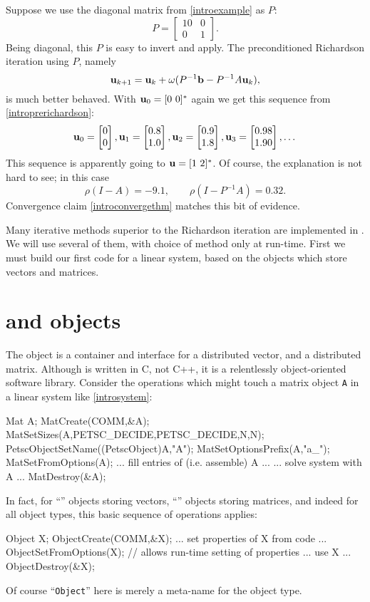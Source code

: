 \medskip\noindent\hrulefill
\begin{examplecont}  Suppose we use the diagonal matrix from  \eqref{introexample} as $P$:
\begin{equation}
P = \begin{bmatrix}
10 & 0 \\ 0 & 1
\end{bmatrix}.  \label{introP}
\end{equation}
Being diagonal, this $P$ is easy to invert and apply.  The preconditioned Richardson iteration using $P$, namely
\begin{equation}
\mathbf{u}_{k+1} = \mathbf{u}_k + \omega (P^{-1} \mathbf{b} - P^{-1} A \mathbf{u}_k),  \label{introprerichardson}
\end{equation}
is much better behaved.  With $\mathbf{u}_0 = [0\,\, 0]^*$ again we get this sequence from \eqref{introprerichardson}:
\begin{equation}
\mathbf{u}_{0} = \begin{bmatrix} 0 \\ 0 \end{bmatrix}, \mathbf{u}_{1} = \begin{bmatrix} 0.8 \\ 1.0 \end{bmatrix}, \mathbf{u}_{2} = \begin{bmatrix} 0.9 \\ 1.8 \end{bmatrix}, \mathbf{u}_{3} = \begin{bmatrix} 0.98 \\ 1.90 \end{bmatrix}, \dots
\end{equation}
This sequence is apparently going to $\mathbf{u} = [1\,\, 2]^*$.  Of course, the explanation is not hard to see; in this case
\begin{equation}
\rho(I-A) = -9.1, \qquad \rho(I-P^{-1} A) = 0.32.
\end{equation}
Convergence claim \eqref{introconvergethm} matches this bit of evidence.
\end{examplecont}
\noindent\hrulefill

Many iterative methods superior to the Richardson iteration are implemented in \PETSc.  We will use several of them, with choice of method only at run-time.  First we must build our first \PETSc code for a linear system, based on the \PETSc objects which store vectors and matrices.


\section{\PETSc \pVec and \pMat objects}

The \pVec object is a container and interface for a distributed vector, and \pMat a distributed matrix.  Although \PETSc is written in C, not C++, it is a relentlessly object-oriented software library.  Consider the operations which might touch a matrix object \texttt{A} in a linear system like \eqref{introsystem}:
\begin{code}
Mat A;
MatCreate(COMM,&A);
MatSetSizes(A,PETSC_DECIDE,PETSC_DECIDE,N,N);
PetscObjectSetName((PetscObject)A,"A");
MatSetOptionsPrefix(A,"a_");
MatSetFromOptions(A);
... fill entries of (i.e. assemble) A ...
... solve system with A ...
MatDestroy(&A);
\end{code}
In fact, for ``\pVec'' objects storing vectors, ``\pMat'' objects storing matrices, and indeed for all \PETSc object types, this basic sequence of operations applies:
\begin{code}
Object X;
ObjectCreate(COMM,&X);
... set properties of X from code ...
ObjectSetFromOptions(X);  // allows run-time setting of properties
... use X ...
ObjectDestroy(&X);
\end{code}
Of course ``\texttt{Object}'' here is merely a meta-name for the object type.

